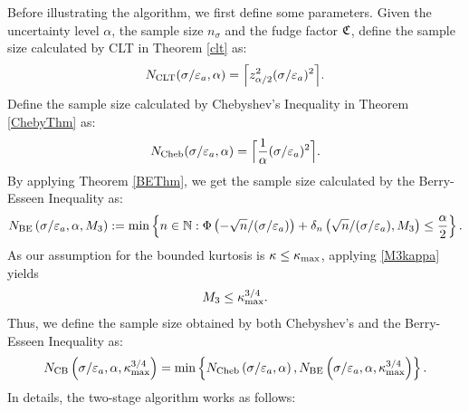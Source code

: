 \documentclass{iitthesis}
\theoremstyle{definition}
\begin{document}
Before illustrating the algorithm, we first define some parameters. Given the uncertainty level $\alpha$, the sample size $n_{\sigma}$ and the fudge factor $\mathfrak{C}$, define the sample size calculated by CLT in Theorem \ref{clt} as:
\begin{equation}\label{NCLTmeanMCabsg}
N_{\text{CLT}}(\sigma/\varepsilon_a,\alpha)
= 
\Bigl\lceil
z_{\alpha/2}^2(\sigma/\varepsilon_a)^2
\Bigr\rceil.
\end{equation}
Define the sample size calculated by Chebyshev's Inequality in Theorem \ref{ChebyThm} as:
\begin{equation}\label{NChebymeanMCabsg}
N_{\text{Cheb}}(\sigma/\varepsilon_a,\alpha)
= 
\Bigl\lceil\frac{1}{\alpha}(\sigma/\varepsilon_a)^2\Bigr\rceil.
\end{equation}
By applying Theorem \ref{BEThm}, we get the sample size calculated by the Berry-Esseen Inequality as:
\begin{equation}\label{NBEmeanMCabsg}
N_{\text{BE}}\left(\sigma/\varepsilon_a,\alpha,M_3\right) := \min \left \{ n \in \mathbb{N} : \Phi\left(-\sqrt{n}/(\sigma/\varepsilon_a)\right)+\delta_n\left(\sqrt{n}/(\sigma/\varepsilon_a),M_3\right)
\le \frac{\alpha}{2} \right \}.
\end{equation}
As our assumption for the bounded kurtosis is $\kappa \leq \kappa_{\max}$, applying \eqref{M3kappa} yields 
\begin{align}\label{M3kmax}
M_3 \leq \kappa_{\max}^{3/4}.
\end{align}
Thus, we define the sample size obtained by both Chebyshev's and the Berry-Esseen Inequality as:
\begin{align}\label{NCBmeanMCabsg}
N_{\text{CB}} \left(\sigma/\varepsilon_a,\alpha, \kappa_{\max}^{3/4}\right)  = \min \left \{ N_{\text{Cheb}}\left(\sigma/\varepsilon_a,\alpha\right),N_{\text{BE}}\left(\sigma/\varepsilon_a,\alpha, \kappa_{\max}^{3/4}\right)\right \}.
\end{align}
In details, the two-stage algorithm works as follows:
\end{document}
